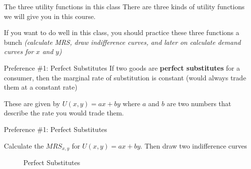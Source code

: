 \documentclass[11pt,t]{beamer}
\begin{document}
\begin{frame}{The three utility functions in this class}
  There are three kinds of utility functions we will give you in this course. 
  
  \bigskip\bigskip
  If you want to do well in this class, you should practice these three functions a bunch \emph{(calculate MRS, draw indifference curves, and later on calculate demand curves for $x$ and $y$)}
\end{frame}

\begin{frame}{Preference \#1: Perfect Substitutes}
  If two goods are \textbf{perfect substitutes} for a consumer, then the marginal rate of substitution is constant (would always trade them at a constant rate)

  \bigskip
  These are given by $U(x,y) = ax + by$ where $a$ and $b$ are two numbers that describe the rate you would trade them.
\end{frame}

\begin{frame}{Preference \#1: Perfect Substitutes}

  \bigskip
  Calculate the $MRS_{x,y}$ for $U(x,y) = ax + by$. Then draw two indifference curves
\end{frame}


\begin{frame}
  \vspace{-5mm}
  \begin{figure}
    \caption{Perfect Substitutes}
    
  \end{figure}
\end{frame}
\end{document}
